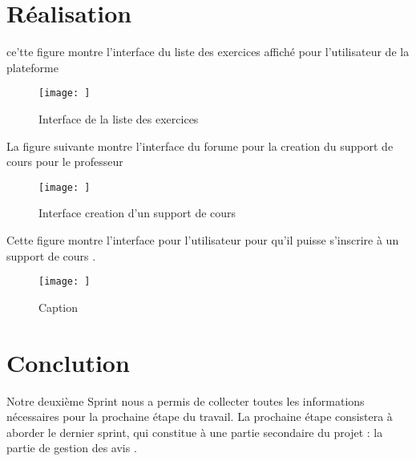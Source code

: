 \section{Réalisation}
ce'tte figure montre l'interface du liste des exercices affiché pour l'utilisateur de la  plateforme 
\begin{figure}
    \centering
    \texttt{[image: ]}
    \caption{Interface de la liste des exercices }
    \label{fig:enter-label}
\end{figure}
La figure suivante montre l'interface du forume pour la creation du support de cours  pour le professeur 
\begin{figure}
    \centering
    \texttt{[image: ]}
    \caption{Interface creation d'un support de cours }
    \label{fig:enter-label}
\end{figure}

Cette figure montre  l'interface pour l'utilisateur pour qu'il puisse s'inscrire à un support de cours .
\begin{figure}
    \centering
    \texttt{[image: ]}
    \caption{Caption}
    \label{fig:enter-label}
\end{figure}

\section{Conclution}
Notre deuxième Sprint nous a permis de collecter toutes les informations nécessaires pour la prochaine étape du travail.
La prochaine étape consistera à aborder le dernier sprint, qui constitue à une partie secondaire du projet : la partie de gestion des avis .